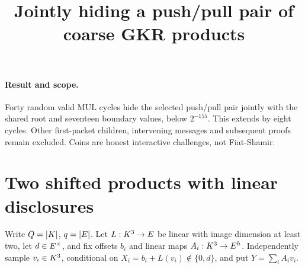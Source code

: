 \documentclass[11pt]{article}
\title{Jointly hiding a push/pull pair of coarse GKR products}
\author{}
\date{}
\begin{document}
\maketitle
\vspace{-2em}

\paragraph{Result and scope.} Forty random valid MUL cycles hide the selected push/pull pair jointly with the shared root and seventeen boundary values, below $2^{-155}$. This extends  by eight cycles. Other first-packet children, intervening messages and subsequent proofs remain excluded. Coins are honest interactive challenges, not Fiat-Shamir.

\section{Two shifted products with linear disclosures}

Write $Q=|K|$, $q=|E|$. Let $L:K^3\to E$ be linear with image dimension at least two, let $d\in E^\times$, and fix offsets $b_i$ and linear maps $A_i:K^3\to E^h$. Independently sample $v_i\in K^3$, conditional on $X_i=b_i+L(v_i)\notin\{0,d\}$, and put $Y=\sum_i A_iv_i$.
\end{document}
